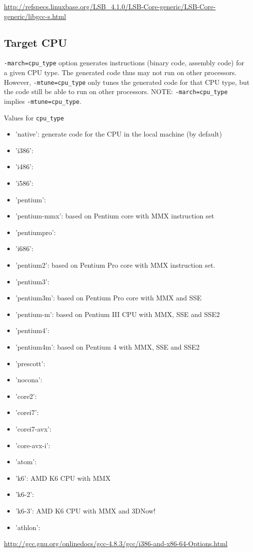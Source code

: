 \url{http://refspecs.linuxbase.org/LSB_4.1.0/LSB-Core-generic/LSB-Core-generic/libgcc-s.html}


\subsection{Target CPU}
\label{sec:GCC_CPU_target}

\verb!-march=cpu_type! option generates instructions (binary code, assembly
code) for a given CPU type. The generated code thus may not run on other
processors. However, \verb!-mtune=cpu_type! only tunes the generated code for
that CPU type, but the code still be able to run on other processors. NOTE:
\verb!-march=cpu_type! implies \verb!-mtune=cpu_type!.

Values for \verb!cpu_type!
\begin{itemize}
  \item 'native': generate code for the CPU in the local machine (by default)
  \item 'i386':
  \item 'i486':
  \item 'i586':
  \item 'pentium':
  \item 'pentium-mmx': based on Pentium core with MMX instruction set
  \item 'pentiumpro':
  \item 'i686':
  \item 'pentium2': based on Pentium Pro core with MMX instruction set.
  \item 'pentium3': 
  \item 'pentium3m': based on Pentium Pro core with MMX and SSE 
  \item 'pentium-m':  based on Pentium III CPU with MMX, SSE and SSE2
  \item 'pentium4':
  \item 'pentium4m': based on Pentium 4 with MMX, SSE and SSE2
  \item 'prescott':
  \item 'nocona':
  \item 'core2':
  \item 'corei7':
  \item 'corei7-avx':
  \item 'core-avx-i':
  \item 'atom':
  \item 'k6': AMD K6 CPU with MMX
  \item 'k6-2':
  \item 'k6-3': AMD K6 CPU with MMX and 3DNow!
  \item 'athlon':
\end{itemize}
\url{http://gcc.gnu.org/onlinedocs/gcc-4.8.3/gcc/i386-and-x86-64-Options.html}

